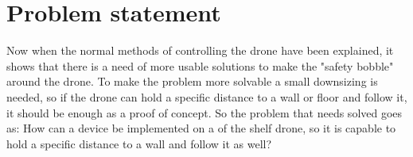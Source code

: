\section{Problem statement}\label{s:problem_statment}
Now when the normal methods of controlling the drone have been explained, it shows that there is a need of more usable solutions to make the "safety bobble" around the drone. To make the problem more solvable a small downsizing is needed, so if the drone can hold a specific distance to a wall or floor and follow it, it should be enough as a proof of concept.
\newline
So the problem that needs solved goes as:
How can a device be implemented on a of the shelf drone, so it is capable to hold a specific distance to a wall and follow it as well?

